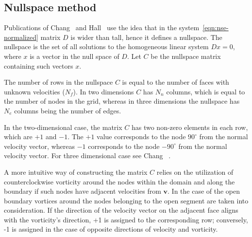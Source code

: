 \documentclass{article}
\begin{document}
\subsection{Nullspace method}

Publications of Chang~\cite{Chang:2002} and Hall~\cite{Hall:1980} use the idea that in the system~\eqref{eqn:nse-normalized} matrix $D$ is wider than tall, hence it defines a nullspace. The nullspace is the set of all solutions to the homogeneous linear system $Dx = 0$, where $x$ is a vector in the null space of $D$. Let $C$ be the nullspace matrix containing such vectors $x$. 

The number of rows in the nullspace $C$ is equal to the number of faces with unknown velocities ($N_f$). In two dimensions $C$ has $N_n$ columns, which is equal to the number of nodes in the grid, whereas in three dimensions the nullspace has $N_e$ columns being the number of edges. 

In the two-dimensional case, the matrix $C$ has two non-zero elements in each row, which are $+1$ and $-1$. The $+1$ value corresponds to the node $90^\circ$ from the normal velocity vector, whereas $-1$ corresponds to the node $-90^\circ$ from the normal velocity vector.  For three dimensional case see Chang ~\cite{Chang:2002}.


A more intuitive way of constructing the matrix $C$ relies on the utilization of counterclockwise vorticity around the nodes within the domain and along the boundary if such nodes have adjacent velocities from $\boldsymbol{v}$. In the case of the open boundary vortices around the nodes belonging to the open segment are taken into consideration. If the direction of the velocity vector on the adjacent face aligns with the vorticity's direction, +1 is assigned to the corresponding row; conversely, -1 is assigned in the case of opposite directions of velocity and vorticity.
\end{document}
